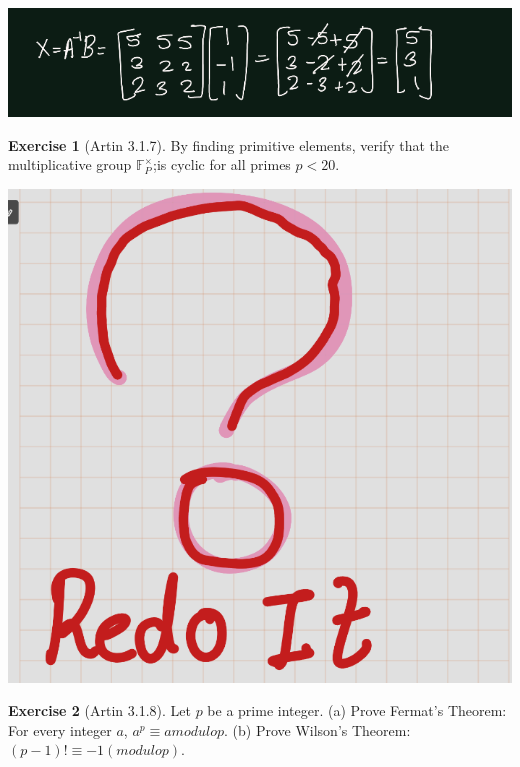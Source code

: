 \documentclass[
]{book}
\theoremstyle{definition}
\theoremstyle{definition}
\theoremstyle{definition}
\newtheorem{exercise}{Exercise}[chapter]
\theoremstyle{definition}
\theoremstyle{remark}
\begin{document}
\includegraphics{figures/ch_3/ex-1.6-5.png}

\begin{exercise}[Artin 3.1.7]
\protect\hypertarget{exr:unnamed-chunk-269}{}\label{exr:unnamed-chunk-269}By finding primitive elements, verify that the multiplicative group \(\mathbb{F}_P^\times\);is cyclic for all primes \(p < 20\).
\end{exercise}

\includegraphics{figures/ch_2/fig100.png}

\begin{exercise}[Artin 3.1.8]
\protect\hypertarget{exr:unnamed-chunk-271}{}\label{exr:unnamed-chunk-271}Let \(p\) be a prime integer.
(a) Prove Fermat's Theorem: For every integer \(a\), \(a^p \equiv a modulo p\).
(b) Prove Wilson's Theorem: \((p -1)!\equiv -1(modulo p)\).
\end{exercise}
\end{document}
